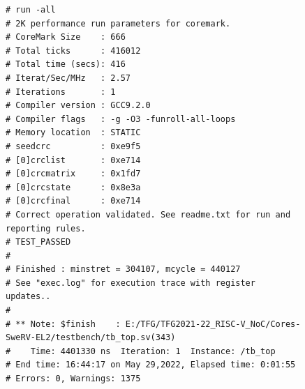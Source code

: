 \begin{figure}[hp]
    \centering
    \begin{verbatim}
# run -all
# 2K performance run parameters for coremark.
# CoreMark Size    : 666
# Total ticks      : 416012
# Total time (secs): 416
# Iterat/Sec/MHz   : 2.57
# Iterations       : 1
# Compiler version : GCC9.2.0
# Compiler flags   : -g -O3 -funroll-all-loops
# Memory location  : STATIC
# seedcrc          : 0xe9f5
# [0]crclist       : 0xe714
# [0]crcmatrix     : 0x1fd7
# [0]crcstate      : 0x8e3a
# [0]crcfinal      : 0xe714
# Correct operation validated. See readme.txt for run and reporting rules.
# TEST_PASSED
#
# Finished : minstret = 304107, mcycle = 440127
# See "exec.log" for execution trace with register updates..
#
# ** Note: $finish    : E:/TFG/TFG2021-22_RISC-V_NoC/Cores-SweRV-EL2/testbench/tb_top.sv(343)
#    Time: 4401330 ns  Iteration: 1  Instance: /tb_top
# End time: 16:44:17 on May 29,2022, Elapsed time: 0:01:55
# Errors: 0, Warnings: 1375
    \end{verbatim}
    \label{fig:sim_cmark}
\end{figure}
